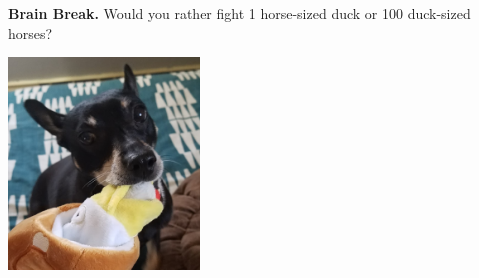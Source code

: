 \documentclass{beamer}
\newcommand{\fn}{\insertframenumber}
\theoremstyle{definition}
\newtheorem{exercise}{Exercise}
\newtheorem*{exa}{Example}
\newtheorem*{recall}{Recall}
\begin{document}
\begin{frame}{\fn}
	\begin{block}{\textbf{Brain Break.}}
		Would you rather fight 1 horse-sized duck or 100 duck-sized horses?
		\begin{center}
			\includegraphics[width=2in]{../images/turducken_Pepper}
		\end{center}
	\end{block}
\end{frame}
%		
\end{document}
